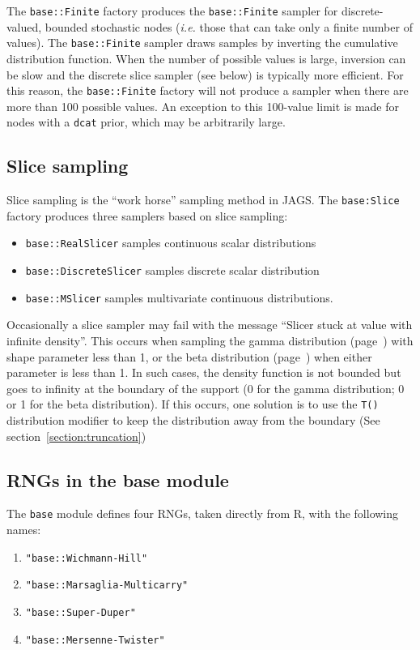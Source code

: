 \documentclass[11pt, a4paper, titlepage]{report}
\newcommand{\JAGS}{\textsf{JAGS}}
\newcommand{\R}{\textsf{R}}
\begin{document}
The \texttt{base::Finite} factory produces the \texttt{base::Finite}
sampler for discrete-valued, bounded stochastic nodes ({\em i.e.}
those that can take only a finite number of values). The
\texttt{base::Finite} sampler draws samples by inverting the
cumulative distribution function. When the number of possible values
is large, inversion can be slow and the discrete slice sampler (see
below) is typically more efficient. For this reason, the
\texttt{base::Finite} factory will not produce a sampler when there
are more than 100 possible values. An exception to this 100-value
limit is made for nodes with a \texttt{dcat} prior, which may be
arbitrarily large.

\subsection{Slice sampling}

Slice sampling \citep{Neal2003} is the ``work horse'' sampling method
in \JAGS. The \texttt{base:Slice} factory produces three samplers
based on slice sampling:
\begin{itemize}
\item \texttt{base::RealSlicer} samples continuous scalar
  distributions
\item \texttt{base::DiscreteSlicer} samples discrete scalar
  distribution
\item \texttt{base::MSlicer} samples multivariate continuous
  distributions.
\end{itemize}

Occasionally a slice sampler may fail with the message ``Slicer stuck
at value with infinite density''. This occurs when sampling the gamma
distribution (page~\pageref{bugs:dgamma}) with shape parameter less
than 1, or the beta distribution (page~\pageref{bugs:dbeta}) when
either parameter is less than 1.  In such cases, the density function
is not bounded but goes to infinity at the boundary of the support (0
for the gamma distribution; 0 or 1 for the beta distribution). If this
occurs, one solution is to use the \texttt{T()} distribution modifier
to keep the distribution away from the boundary (See
section~\ref{section:truncation})

\subsection{RNGs in the base module}

The \texttt{base} module defines four RNGs, taken directly from \R,
with the following names:
\begin{enumerate}
\item \verb+"base::Wichmann-Hill"+
\item \verb+"base::Marsaglia-Multicarry"+
\item \verb+"base::Super-Duper"+
\item \verb+"base::Mersenne-Twister"+
\end{enumerate}
\end{document}
